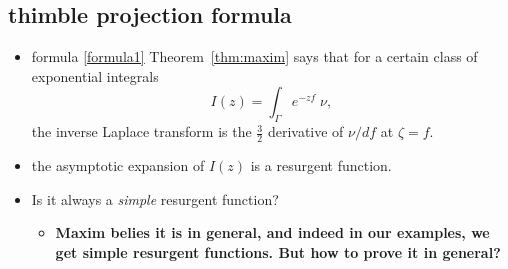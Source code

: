\documentclass{article}
\theoremstyle{definition}
\newcommand{\laplace}{\mathcal{L}}
\newcommand{\borel}{\mathcal{B}}
\begin{document}


\color{black}


\subsection{thimble projection formula}
\begin{itemize}
\item formula \eqref{formula1} Theorem~\ref{thm:maxim} says that for a certain class of exponential integrals
\[ I(z) = \int_\Gamma e^{-zf}\;\nu, \]
the inverse Laplace transform is the $\tfrac{3}{2}$ derivative of $\nu/df$ at $\zeta=f$.
\item the asymptotic expansion of $I(z)$ is a resurgent function.
\item Is it always a \emph{simple} resurgent function?
\begin{itemize}
\item \textbf{Maxim belies it is in general, and indeed in our examples, we get simple resurgent functions. But how to prove it in general?}
\end{itemize} 
\end{itemize}
\end{document}
